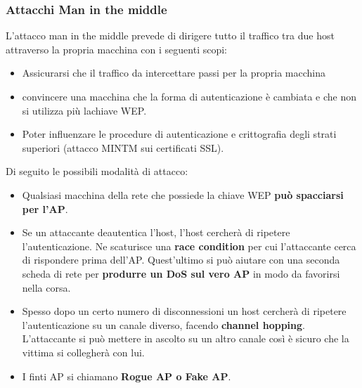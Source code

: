 \documentclass[12pt]{article}
\begin{document}
			\subsubsection{Attacchi Man in the middle}
				L'attacco man in the middle prevede di dirigere tutto il traffico tra due host attraverso la propria macchina con i seguenti scopi:
				\begin{itemize}
					\item Assicurarsi che il traffico da intercettare passi per la propria macchina 
					\item convincere una macchina che la forma di autenticazione è cambiata e che non si utilizza più lachiave WEP.
					\item Poter influenzare le procedure di autenticazione e crittografia degli strati superiori (attacco MINTM sui certificati SSL).
				\end{itemize}
				Di seguito le possibili modalità di attacco:
				\begin{itemize}
					\item Qualsiasi macchina della rete che possiede la chiave WEP \textbf{può spacciarsi per l'AP}.
					\item Se un attaccante deautentica l'host, l'host cercherà di ripetere l'autenticazione. Ne scaturisce una \textbf{race condition} per cui l'attaccante cerca di rispondere prima dell'AP. Quest'ultimo si può aiutare con una seconda scheda di rete per \textbf{produrre un DoS sul vero AP} in modo da favorirsi nella corsa.
					\item Spesso dopo un certo numero di disconnessioni un host cercherà di ripetere l'autenticazione su un canale diverso, facendo \textbf{channel hopping}. L'attaccante si può mettere in ascolto su un altro canale così è sicuro che la vittima si collegherà con lui.
					\item I finti AP si chiamano \textbf{Rogue AP o Fake AP}.
				\end{itemize}	
				
\end{document}
